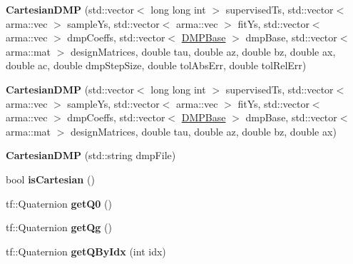 \begin{DoxyCompactItemize}
\item 
{\bfseries Cartesian\+D\+MP} (std\+::vector$<$ long long int $>$ supervised\+Ts, std\+::vector$<$ arma\+::vec $>$ sample\+Ys, std\+::vector$<$ arma\+::vec $>$ fit\+Ys, std\+::vector$<$ arma\+::vec $>$ dmp\+Coeffs, std\+::vector$<$ \hyperlink{classkukadu_1_1DMPBase}{D\+M\+P\+Base} $>$ dmp\+Base, std\+::vector$<$ arma\+::mat $>$ design\+Matrices, double tau, double az, double bz, double ax, double ac, double dmp\+Step\+Size, double tol\+Abs\+Err, double tol\+Rel\+Err)\hypertarget{classkukadu_1_1CartesianDMP_a15d4b72e6c4a9ff41c8d55e7b9319745}{}\label{classkukadu_1_1CartesianDMP_a15d4b72e6c4a9ff41c8d55e7b9319745}

\item 
{\bfseries Cartesian\+D\+MP} (std\+::vector$<$ long long int $>$ supervised\+Ts, std\+::vector$<$ arma\+::vec $>$ sample\+Ys, std\+::vector$<$ arma\+::vec $>$ fit\+Ys, std\+::vector$<$ arma\+::vec $>$ dmp\+Coeffs, std\+::vector$<$ \hyperlink{classkukadu_1_1DMPBase}{D\+M\+P\+Base} $>$ dmp\+Base, std\+::vector$<$ arma\+::mat $>$ design\+Matrices, double tau, double az, double bz, double ax)\hypertarget{classkukadu_1_1CartesianDMP_a74ddc33d815d96b26106710b049d53f5}{}\label{classkukadu_1_1CartesianDMP_a74ddc33d815d96b26106710b049d53f5}

\item 
{\bfseries Cartesian\+D\+MP} (std\+::string dmp\+File)\hypertarget{classkukadu_1_1CartesianDMP_a997fb24bb6822ffe0dfd9ae6baabf1eb}{}\label{classkukadu_1_1CartesianDMP_a997fb24bb6822ffe0dfd9ae6baabf1eb}

\item 
bool {\bfseries is\+Cartesian} ()\hypertarget{classkukadu_1_1CartesianDMP_a5a34b24a6adb33e88d5850e6d3eaac0d}{}\label{classkukadu_1_1CartesianDMP_a5a34b24a6adb33e88d5850e6d3eaac0d}

\item 
tf\+::\+Quaternion {\bfseries get\+Q0} ()\hypertarget{classkukadu_1_1CartesianDMP_a705f7a1a000bfa01818272eadd44baaa}{}\label{classkukadu_1_1CartesianDMP_a705f7a1a000bfa01818272eadd44baaa}

\item 
tf\+::\+Quaternion {\bfseries get\+Qg} ()\hypertarget{classkukadu_1_1CartesianDMP_a955ca43e43d62e25dbd765b527fec609}{}\label{classkukadu_1_1CartesianDMP_a955ca43e43d62e25dbd765b527fec609}

\item 
tf\+::\+Quaternion {\bfseries get\+Q\+By\+Idx} (int idx)\hypertarget{classkukadu_1_1CartesianDMP_ace0ee0c745d7d3dd6f5d2a04715fc173}{}\label{classkukadu_1_1CartesianDMP_ace0ee0c745d7d3dd6f5d2a04715fc173}


\end{DoxyCompactItemize}
